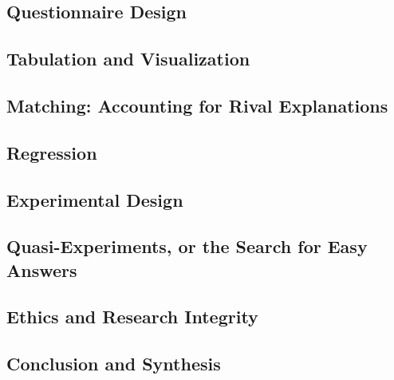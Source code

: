 \documentclass[12pt,a4paper]{article}
\begin{document}
\subsection{Questionnaire Design}

\subsection{Tabulation and Visualization}

\subsection{Matching: Accounting for Rival Explanations}

\subsection{Regression}

\subsection{Experimental Design}

\subsection{Quasi-Experiments, or the Search for Easy Answers}

\subsection{Ethics and Research Integrity}

\subsection{Conclusion and Synthesis}




\end{document}
